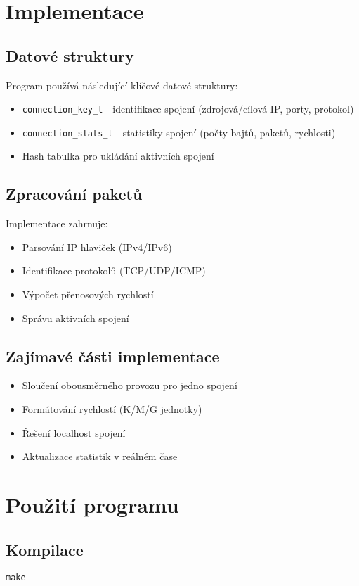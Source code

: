 \documentclass[a4paper,11pt]{article}
\theoremstyle{definition}
\begin{document}
\section{Implementace}
\subsection{Datové struktury}
Program používá následující klíčové datové struktury:
\begin{itemize}
    \item \texttt{connection\_key\_t} - identifikace spojení (zdrojová/cílová IP, porty, protokol)
    \item \texttt{connection\_stats\_t} - statistiky spojení (počty bajtů, paketů, rychlosti)
    \item Hash tabulka pro ukládání aktivních spojení
\end{itemize}

\subsection{Zpracování paketů}
Implementace zahrnuje:
\begin{itemize}
    \item Parsování IP hlaviček (IPv4/IPv6)
    \item Identifikace protokolů (TCP/UDP/ICMP)
    \item Výpočet přenosových rychlostí
    \item Správu aktivních spojení
\end{itemize}

\subsection{Zajímavé části implementace}
\begin{itemize}
    \item Sloučení obousměrného provozu pro jedno spojení
    \item Formátování rychlostí (K/M/G jednotky)
    \item Řešení localhost spojení
    \item Aktualizace statistik v reálném čase
\end{itemize}

\section{Použití programu}
\subsection{Kompilace}
\begin{verbatim}
make
\end{verbatim}
\end{document}

